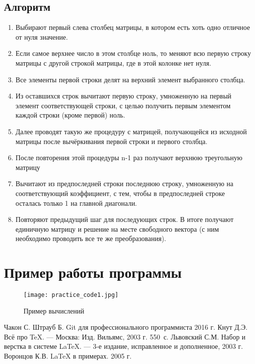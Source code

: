 \documentclass[12pt,a4paper]{scrartcl}
\begin{document}
\subsection{Алгоритм}
\label{sec:example}
\begin{enumerate}
	\item Выбирают первый слева столбец матрицы, в котором есть хоть одно отличное от нуля значение.
	\item Если самое верхнее число в этом столбце ноль, то меняют всю первую строку матрицы с другой строкой матрицы, где в этой колонке нет нуля.
	\item Все элементы первой строки делят на верхний элемент выбранного столбца.
	\item Из оставшихся строк вычитают первую строку, умноженную на первый элемент соответствующей строки, с целью получить первым элементом каждой строки (кроме первой) ноль.
	\item Далее проводят такую же процедуру с матрицей, получающейся из исходной матрицы после вычёркивания первой строки и первого столбца.
	\item После повторения этой процедуры n-1 раз получают верхнюю треугольную матрицу
	\item Вычитают из предпоследней строки последнюю строку, умноженную на соответствующий коэффициент, с тем, чтобы в предпоследней строке осталась только 1 на главной диагонали.
	\item Повторяют предыдущий шаг для последующих строк. В итоге получают единичную матрицу и решение на месте свободного вектора (с ним необходимо проводить все те же преобразования).
\end{enumerate}
\newpage
\section{Пример работы программы}
\label{pic:example}
\begin{figure}[h]
	\centering
	\texttt{[image: practice\_code1.jpg]}
	\caption{Пример вычислений}\label{fig:par}
\end{figure}
\begin{thebibliography}{9}
	Чакон С. Штрауб Б. Git для профессионального программиста 2016 г.
	Кнут Д.Э. Всё про \TeX. \newblock --- Москва: Изд. Вильямс, 2003 г. 550~с.
	Львовский С.М. Набор и верстка в системе \LaTeX{}. \newblock --- 3-е издание, исправленное и дополненное, 2003 г.
	Воронцов К.В. \LaTeX{} в примерах. 2005 г.
\end{thebibliography}
\end{document}
